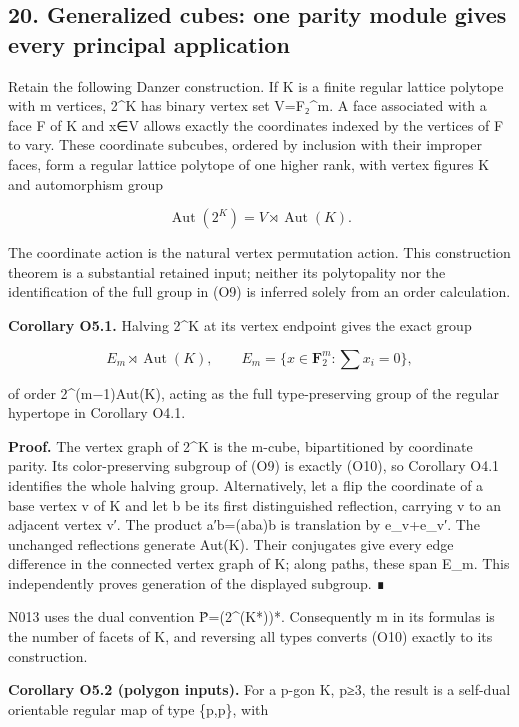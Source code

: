 \documentclass[
  10pt,
  letterpaper,
]{article}
\begin{document}
\subsection{20. Generalized cubes: one parity module gives every
principal
application}\label{generalized-cubes-one-parity-module-gives-every-principal-application}

Retain the following Danzer construction. If K is a finite regular
lattice polytope with m vertices, 2\^{}K has binary vertex set
V=F₂\^{}m. A face associated with a face F of K and x∈V allows exactly
the coordinates indexed by the vertices of F to vary. These coordinate
subcubes, ordered by inclusion with their improper faces, form a regular
lattice polytope of one higher rank, with vertex figures K and
automorphism group

\[
\operatorname{Aut}(2^K)=V\rtimes\operatorname{Aut}(K).
\tag{O9}
\]

The coordinate action is the natural vertex permutation action. This
construction theorem is a substantial retained input; neither its
polytopality nor the identification of the full group in (O9) is
inferred solely from an order calculation.

\textbf{Corollary O5.1.} Halving 2\^{}K at its vertex endpoint gives the
exact group

\[
E_m\rtimes\operatorname{Aut}(K),\qquad
E_m=\{x\in\mathbf F_2^m:\sum x_i=0\},
\tag{O10}
\]

of order 2\^{}(m−1)\textbar Aut(K)\textbar, acting as the full
type-preserving group of the regular hypertope in Corollary O4.1.

\textbf{Proof.} The vertex graph of 2\^{}K is the m-cube, bipartitioned
by coordinate parity. Its color-preserving subgroup of (O9) is exactly
(O10), so Corollary O4.1 identifies the whole halving group.
Alternatively, let a flip the coordinate of a base vertex v of K and let
b be its first distinguished reflection, carrying v to an adjacent
vertex v′. The product a′b=(aba)b is translation by e\_v+e\_v′. The
unchanged reflections generate Aut(K). Their conjugates give every edge
difference in the connected vertex graph of K; along paths, these span
E\_m. This independently proves generation of the displayed subgroup. ∎

N013 uses the dual convention P̂=(2\^{}(K*))*. Consequently m in its
formulas is the number of facets of K, and reversing all types converts
(O10) exactly to its construction.

\textbf{Corollary O5.2 (polygon inputs).} For a p-gon K, p≥3, the result
is a self-dual orientable regular map of type \{p,p\}, with
\end{document}
